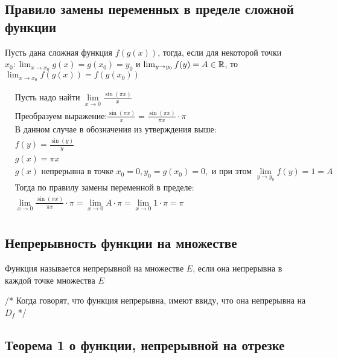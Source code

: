 \subsection{Правило замены переменных в пределе сложной функции}

{
    Пусть дана сложная функция $ f(g(x)) $, тогда, если для некоторой точки 
    $ x_0:  \lim_{x \to x_0} g(x) = g(x_0) = y_0 $ и $ \lim_{y \to y_0} f(y) = A \in \Rset $, то
    $ \lim_{x \to x_0} f(g(x)) = f(g(x_0)) $
}

{
\[\begin{split}
    & \text{Пусть надо найти } \lim_{x \to 0} \frac{\sin(\pi x)}{x} \\
    & \text{Преобразуем выражение:} \frac{\sin(\pi x)}{x} = \frac{\sin(\pi x)}{\pi x} \cdot \pi \\
    & \text{В данном случае в обозначения из утверждения выше:} \\
    & f(y) = \frac{\sin(y)}{y} \\ 
    & g(x) = \pi x \\
    & g(x) \text{ непрерывна в точке } x_0 = 0, y_0 = g(x_0) = 0, \text{ и при этом } \lim_{y \to y_0} f(y) = 1 = A \\
    & \text{Тогда по правилу замены переменной в пределе:} \\
    & \lim_{x \to 0} \frac{\sin(\pi x)}{\pi x} \cdot \pi = \lim_{x \to 0} A \cdot \pi = \lim_{x \to 0} 1 \cdot \pi = \pi \\
\end{split}\]
}

\subsection{Непрерывность функции на множестве}

{
    Функция называется непрерывной на множестве $E$, если она непрерывна в каждой точке множества $E$

    /* Когда говорят, что функция непрерывна, имеют ввиду, что она непрерывна на $D_f$ */
}


\subsection{Теорема 1 о функции, непрерывной на отрезке}

